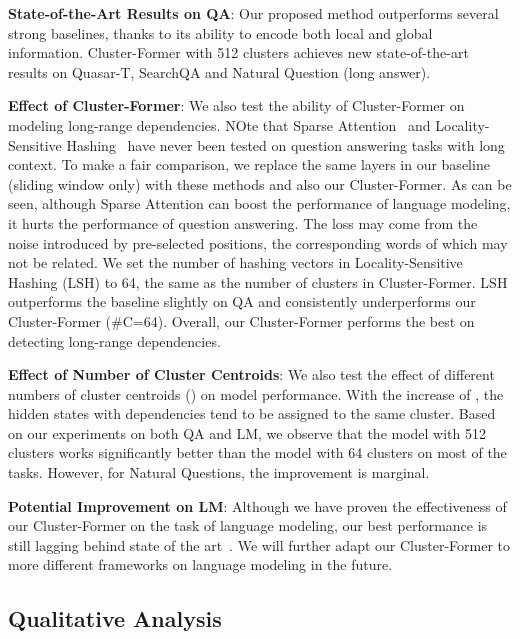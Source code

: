 \documentclass[11pt,a4paper]{article}
\begin{document}
\vspace{2pt}
\noindent \textbf{State-of-the-Art Results on QA}: Our proposed method outperforms several strong baselines, thanks to its ability to encode both local and global information.
Cluster-Former with 512 clusters achieves new state-of-the-art results on Quasar-T, SearchQA and Natural Question (long answer).

\vspace{2pt}
\noindent \textbf{Effect of Cluster-Former}: We also test the ability of Cluster-Former on modeling long-range dependencies.
NOte that  Sparse Attention~\cite{sparsetransf} and Locality-Sensitive Hashing~\cite{reformer} have never been tested on question answering tasks with long context.
To make a fair comparison, we replace the same layers in our baseline (sliding window only) with these methods and also our Cluster-Former.
As can be seen, although Sparse Attention can boost the performance of language modeling, it hurts the performance of question answering.
The loss may come from the noise introduced by pre-selected positions, the corresponding words of which may not be related.
We set the number of hashing vectors in Locality-Sensitive Hashing (LSH) to 64, the same as the number of clusters in Cluster-Former.
LSH outperforms the baseline slightly on QA and consistently underperforms our Cluster-Former (\#C=64).
Overall, our Cluster-Former performs the best on detecting long-range dependencies.

\vspace{2pt}
\noindent \textbf{Effect of Number of Cluster Centroids}: 
We also test the effect of different numbers of cluster centroids () on model performance. 
With the increase of , the hidden states with dependencies tend to be assigned to the same cluster.
Based on our experiments on both QA and LM, we observe that the model with 512 clusters works significantly better than the model with 64 clusters on most of the tasks.
However, for Natural Questions, the improvement is marginal.


\vspace{2pt}
\noindent \textbf{Potential Improvement on LM}: 
Although we have proven the effectiveness of our Cluster-Former on the task of language modeling, our best performance is still lagging behind state of the art~\cite{adaptspan}.
We will further adapt our Cluster-Former to more different frameworks on language modeling in the future.
\subsection{Qualitative Analysis}
\end{document}
